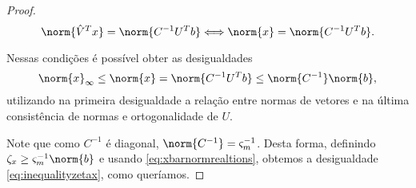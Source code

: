 \begin{proof}
\[
\norm{\hat{V}^Tx } = \norm{C^{-1} U^Tb}  \Longleftrightarrow \norm{x } =
\norm{C^{-1}U^Tb}.
\]

Nessas condições é possível obter as  desigualdades
\begin{equation}
\label{eq:xbarnormrealtions}
\norm{x }_\infty \leq \norm{x } = \norm{C^{-1}U^Tb} \leq
\norm{C^{-1}}\norm{b},
\end{equation}
utilizando na primeira desigualdade a relação entre normas de vetores e na
última consistência de normas e ortogonalidade de $U$.

Note que como $C^{-1}$ é diagonal,  $\norm{C^{-1}} =
\varsigma_m^{-1}$. Desta forma, definindo $\zeta_x \geq
\varsigma_m^{-1}\norm{b}$ e usando \eqref{eq:xbarnormrealtions}, obtemos a desigualdade
\eqref{eq:inequalityzetax}, como queríamos.

\end{proof}
% 
% 
%  
%  
%  
% 
% 
% 
% 
